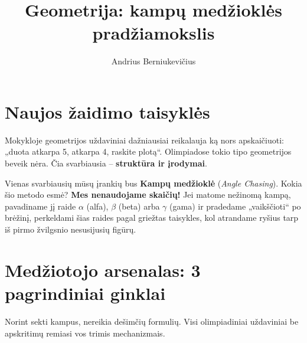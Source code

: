 \documentclass[11pt,a4paper]{scrartcl}
\title{Geometrija: kampų medžioklės pradžiamokslis}
\author{Andrius Berniukevičius}
\begin{document}
\maketitle

\section{Naujos žaidimo taisyklės}

Mokykloje geometrijos uždaviniai dažniausiai reikalauja ką nors apskaičiuoti: „duota atkarpa 5, atkarpa 4, raskite plotą“. Olimpiadose tokio tipo geometrijos beveik nėra. Čia svarbiausia – \textbf{struktūra ir įrodymai}.

Vienas svarbiausių mūsų įrankių bus \textbf{Kampų medžioklė} (\textit{Angle Chasing}). 
Kokia šio metodo esmė? \textbf{Mes nenaudojame skaičių!} Jei matome nežinomą kampą, pavadiname jį raide $\alpha$ (alfa), $\beta$ (beta) arba $\gamma$ (gama) ir pradedame „vaikščioti“ po brėžinį, perkeldami šias raides pagal griežtas taisykles, kol atrandame ryšius tarp iš pirmo žvilgsnio nesusijusių figūrų.

\section{Medžiotojo arsenalas: 3 pagrindiniai ginklai}

Norint sekti kampus, nereikia dešimčių formulių. Visi olimpiadiniai uždaviniai be apskritimų remiasi vos trimis mechanizmais.
\end{document}
